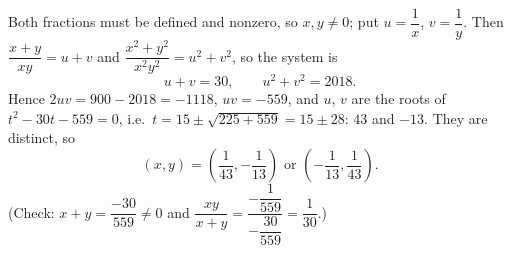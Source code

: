 Both fractions must be defined and nonzero, so $x,y\ne0$; put $u=\dfrac{1}{x}$, $v=\dfrac{1}{y}$. Then $\dfrac{x+y}{xy}=u+v$ and $\dfrac{x^2+y^2}{x^2y^2}=u^2+v^2$, so the system is
\[
u+v=30,\qquad u^2+v^2=2018 .
\]
Hence $2uv=900-2018=-1118$, $uv=-559$, and $u$, $v$ are the roots of $t^2-30t-559=0$, i.e.\ $t=15\pm\sqrt{225+559}=15\pm28$: $43$ and $-13$. They are distinct, so
\[
\boxed{(x,y)=\left(\dfrac{1}{43},-\dfrac{1}{13}\right)\text{ or }\left(-\dfrac{1}{13},\dfrac{1}{43}\right)}.
\]
(Check: $x+y=\dfrac{-30}{559}\ne0$ and $\dfrac{xy}{x+y}=\dfrac{-\dfrac{1}{559}}{-\dfrac{30}{559}}=\dfrac{1}{30}$.)
